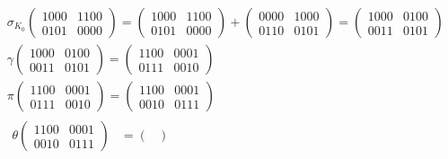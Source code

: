 \documentclass[fleqn]{article}
\begin{document}
    \begin{equation*}
        \begin{aligned}
            &\sigma_{K_0}
            \begin{pmatrix}
                1000 & 1100 \\
                0101 & 0000
            \end{pmatrix} = 
            \begin{pmatrix}
                1000 & 1100 \\
                0101 & 0000
            \end{pmatrix} + 
            \begin{pmatrix}
                0000 & 1000 \\
                0110 & 0101
            \end{pmatrix} = 
            \begin{pmatrix}
                1000 & 0100 \\
                0011 & 0101
            \end{pmatrix} \\
            &\gamma \begin{pmatrix}
                1000 & 0100 \\
                0011 & 0101
            \end{pmatrix} =
            \begin{pmatrix}
                1100 & 0001 \\
                0111 & 0010
            \end{pmatrix} \\
            &\pi \begin{pmatrix}
                1100 & 0001 \\
                0111 & 0010
            \end{pmatrix} =
            \begin{pmatrix}
                1100 & 0001 \\
                0010 & 0111
            \end{pmatrix} \\
            &\begin{aligned} 
                \theta 
                \begin{pmatrix}
                    1100 & 0001 \\
                    0010 & 0111
                \end{pmatrix} &=
                \begin{pmatrix}

\end{pmatrix}
\end{aligned}
\end{aligned}
\end{equation*}
\end{document}
